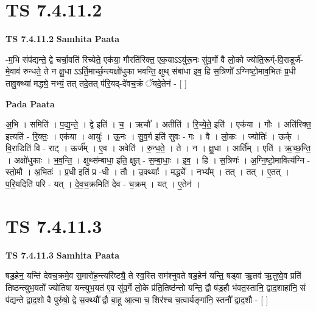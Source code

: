 \documentclass[17pt]{extarticle}
\begin{document}
\section*{ TS 7.4.11.2 }

\textbf{TS 7.4.11.2 } \newline
\textbf{Samhita Paata} \newline

-म॒भि संप॑द्यन्ते॒ द्वे चर्चा॒वति॑ रिच्येते॒ एक॑या॒ गौरति॑रिक्त॒ एक॒याऽऽयु॑रू॒नः सु॑व॒र्गो वै लो॒को ज्योति॒रूर्ग्-वि॒राडूर्ज॑-मे॒वाव॑ रुन्धते॒ ते न क्षु॒धा ऽऽर्ति॒मार्च्छ॒न्त्यक्षो॑धुका भवन्ति॒ क्षुथ् स॑बांधा इव॒ हि स॒त्रिणो᳚ ऽग्निष्टो॒माव॒भितः॑ प्र॒धी तावु॒क्थ्या॑ मद्ध्ये॒ नभ्यं॒ तत् तदे॒तत् प॑रि॒यद्-दे॑वच॒क्रं ॅयदे॒तेन॑ - [  ] \newline

\textbf{Pada Paata} \newline

अ॒भि । समिति॑ । प॒द्य॒न्ते॒ । द्वे इति॑ । च॒ । ऋचौ᳚ । अतीति॑ । रि॒च्ये॒ते॒ इति॑ । एक॑या । गौः । अति॑रिक्त॒ इत्यति॑ - रि॒क्तः॒ । एक॑या । आयुः॑ । ऊ॒नः । सु॒व॒र्ग इति॑ सुवः - गः । वै । लो॒कः । ज्योतिः॑ । ऊर्क् । वि॒राडिति॑ वि - राट् । ऊर्ज᳚म् । ए॒व । अवेति॑ । रु॒न्ध॒ते॒ । ते । न । क्षु॒धा । आर्ति᳚म् । एति॑ । ऋ॒च्छ॒न्ति॒ । अक्षो॑धुकाः । भ॒व॒न्ति॒ । क्षुथ्स॑म्बाधा॒ इति॒ क्षुत् - स॒म्बा॒धाः॒ । इ॒व॒ । हि । स॒त्रिणः॑ । अ॒ग्नि॒ष्टो॒मावित्य॑ग्नि - स्तो॒मौ । अ॒भितः॑ । प्र॒धी इति॑ प्र -धी । तौ । उ॒क्थ्याः᳚ । मद्ध्ये᳚ । नभ्य᳚म् । तत् । तत् । ए॒तत् । प॒रि॒यदिति॑ परि - यत् । दे॒व॒च॒क्रमिति॑ देव - च॒क्रम् । यत् । ए॒तेन॑ ।  \newline




\section*{ TS 7.4.11.3 }

\textbf{TS 7.4.11.3 } \newline
\textbf{Samhita Paata} \newline

षड॒हेन॒ यन्ति॑ देवच॒क्रमे॒व स॒मारो॑ह॒न्त्यरि॑ष्ट्यै॒ ते स्व॒स्ति सम॑श्नुवते षड॒हेन॑ यन्ति॒ षड्वा ऋ॒तव॑ ऋ॒तुष्वे॒व प्रति॑ तिष्ठन्त्युभ॒यतो᳚ ज्योतिषा यन्त्युभ॒यत॑ ए॒व सु॑व॒र्गे लो॒के प्र॑ति॒तिष्ठ॑न्तो यन्ति॒ द्वौ ष॑ड॒हौ भ॑वत॒स्तानि॒ द्वाद॒शाहा॑नि॒ सं प॑द्यन्ते द्वाद॒शो वै पुरु॑षो॒ द्वे स॒क्थ्यौ᳚ द्वौ बा॒हू आ॒त्मा च॒ शिर॑श्च च॒त्वार्यङ्गा॑नि॒ स्तनौ᳚ द्वाद॒शौ - [  ] \newline
\end{document}
